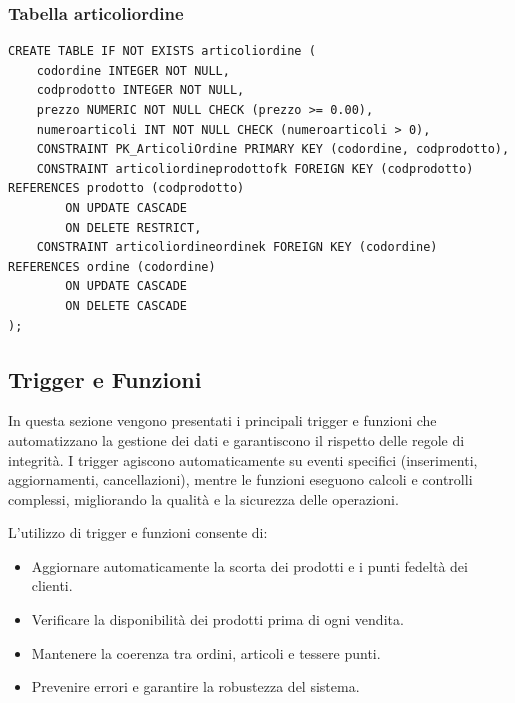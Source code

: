 \documentclass[a4paper,12pt]{article}
\begin{document}
\subsubsection*{Tabella articoliordine}

\vspace{1.5em}
\begin{lstlisting}[style=sqlstyle]
CREATE TABLE IF NOT EXISTS articoliordine (
    codordine INTEGER NOT NULL,
    codprodotto INTEGER NOT NULL,
    prezzo NUMERIC NOT NULL CHECK (prezzo >= 0.00),
    numeroarticoli INT NOT NULL CHECK (numeroarticoli > 0),
    CONSTRAINT PK_ArticoliOrdine PRIMARY KEY (codordine, codprodotto),
    CONSTRAINT articoliordineprodottofk FOREIGN KEY (codprodotto) REFERENCES prodotto (codprodotto)
        ON UPDATE CASCADE
        ON DELETE RESTRICT,
    CONSTRAINT articoliordineordinek FOREIGN KEY (codordine) REFERENCES ordine (codordine)
        ON UPDATE CASCADE
        ON DELETE CASCADE
);
\end{lstlisting}
\vspace{1.5em}

\subsection{Trigger e Funzioni}

\noindent
In questa sezione vengono presentati i principali trigger e funzioni che automatizzano la gestione dei dati e garantiscono il rispetto delle regole di integrità. I trigger agiscono automaticamente su eventi specifici (inserimenti, aggiornamenti, cancellazioni), mentre le funzioni eseguono calcoli e controlli complessi, migliorando la qualità e la sicurezza delle operazioni.\newline
\vspace{0.5em}
\begin{tcolorbox}[colback=mygray,colframe=myblue,title=Nota Importante]
L'utilizzo di trigger e funzioni consente di:
\begin{itemize}
    \item Aggiornare automaticamente la scorta dei prodotti e i punti fedeltà dei clienti.
    \item Verificare la disponibilità dei prodotti prima di ogni vendita.
    \item Mantenere la coerenza tra ordini, articoli e tessere punti.
    \item Prevenire errori e garantire la robustezza del sistema.
\end{itemize}
\end{tcolorbox}
\end{document}
